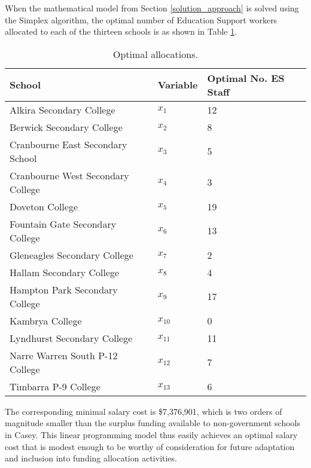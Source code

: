 \documentclass[11pt, a4paper]{article}
\begin{document}
    When the mathematical model from Section \ref{solution_approach} is solved using the Simplex algorithm, the optimal number of Education Support workers allocated to each of the thirteen schools is as shown in Table \ref{results3}.

    \begin{table}[!ht]
        \centering
        \caption{Optimal allocations.}
        \begin{tabular}{|l|l|l|}
            \hline
            School & Variable & Optimal No. ES Staff        \\ \hline
            Alkira Secondary College & $x_1$ & 12             \\ \hline
            Berwick Secondary College & $x_2$ & 8          \\ \hline
            Cranbourne East Secondary School & $x_3$ & 5            \\ \hline
            Cranbourne West Secondary College & $x_4$ & 3          \\ \hline
            Doveton College & $x_5$ & 19                        \\ \hline
            Fountain Gate Secondary College & $x_6$ & 13             \\ \hline
            Gleneagles Secondary College & $x_7$ & 2           \\ \hline
            Hallam Secondary College & $x_8$ & 4               \\ \hline
            Hampton Park Secondary College & $x_9$ & 17             \\ \hline
            Kambrya College & $x_{10}$ & 0                     \\ \hline
            Lyndhurst Secondary College & $x_{11}$ & 11                 \\ \hline
            Narre Warren South P-12 College & $x_{12}$ & 7                 \\ \hline
            Timbarra P-9 College & $x_{13}$ & 6                    \\ \hline
        \end{tabular}
        \label{results3}
    \end{table}

    The corresponding minimal salary cost is \$7,376,901, which is two orders of magnitude smaller than the surplus funding available to non-government schools in Casey. This linear programming model thus easily achieves an optimal salary cost that is modest enough to be worthy of consideration for future adaptation and inclusion into funding allocation activities.
\end{document}

